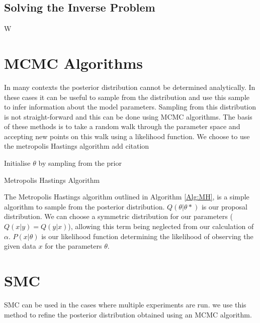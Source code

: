 \subsection{Solving the Inverse Problem} 
W


\section{MCMC Algorithms}
In many contexts the posterior distribution cannot be determined analytically. In these cases it can be useful to sample from the distribution and use this sample to infer information about the model parameters. Sampling from this distribution is not straight-forward and this can be done using MCMC algorithms. The basis of these methods is to take a random walk through the parameter space and accepting new points on this walk using a likelihood function. We choose to use the metropolis Hastings algorithm add citation
\begin{algorithm}[H]
\SetAlgoLined
{}
 Initialise $\theta$ by sampling from the prior\;
 \caption{Metropolis Hastings Algorithm}
 \label{Alg:MH-App}
\end{algorithm}

The Metropolis Hastings algorithm outlined in Algorithm \ref{Alg:MH}, is a simple algorithm to sample from the posterior distribution. $Q(\theta|\theta*)$ is our proposal distribution. We can choose a symmetric distribution for our parameters ($Q(x|y)=Q(y|x)$), allowing this term being neglected from our calculation of $\alpha$. $P(x|\theta)$ is our likelihood function determining the likelihood of observing the given data $x$ for the parameters $\theta$. 


\section{SMC} 
SMC can be used in the cases where multiple experiments are run. we use this method to refine the posterior distribution obtained using an MCMC algorithm.